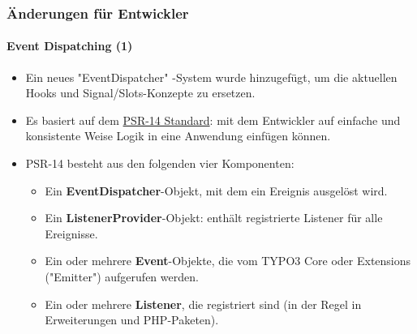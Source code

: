 \begin{frame}[fragile]
	\frametitle{Änderungen für Entwickler}
	\framesubtitle{Event Dispatching (1)}

	\begin{itemize}
		\item Ein neues "EventDispatcher" -System wurde hinzugefügt, um die aktuellen
			Hooks und Signal/Slots-Konzepte zu ersetzen.

		\item Es basiert auf dem \href{https://www.php-fig.org/psr/psr-14}{PSR-14 Standard}:
			mit dem Entwickler auf einfache und konsistente Weise Logik in eine Anwendung einfügen können.

		\item PSR-14 besteht aus den folgenden vier Komponenten:

			\begin{itemize}
				\item Ein \textbf{EventDispatcher}-Objekt, mit dem ein Ereignis ausgelöst wird.
				\item Ein \textbf{ListenerProvider}-Objekt: enthält registrierte Listener für alle Ereignisse.
				\item Ein oder mehrere \textbf{Event}-Objekte, die vom TYPO3 Core oder Extensions ("Emitter") aufgerufen werden.
				\item Ein oder mehrere \textbf{Listener}, die registriert sind (in der Regel in Erweiterungen und PHP-Paketen).
			\end{itemize}


	\end{itemize}

\end{frame}


